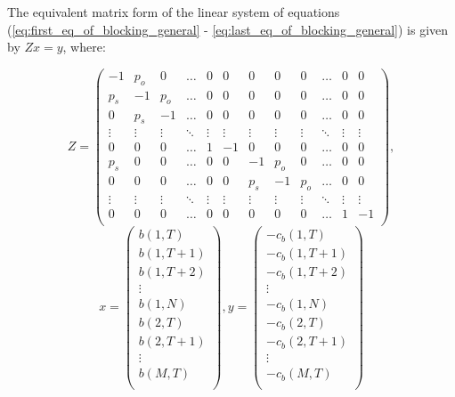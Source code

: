 The equivalent matrix form of the linear system of equations
(\ref{eq:first_eq_of_blocking_general} - \ref{eq:last_eq_of_blocking_general})
is given by \(Zx=y\), where:

\newcommand{\secondallthedots}{\vdots & \vdots & \vdots & \ddots & \vdots & \vdots &
\vdots & \vdots & \vdots & \ddots & \vdots & \vdots}

\begin{equation}
    Z =
    \begin{pmatrix}
        -1 & p_o & 0 & \dots & 0 & 0 & 0 & 0 & 0 & \dots & 0 & 0 \\ %
        p_s & -1 & p_o & \dots & 0 & 0 & 0 & 0 & 0 & \dots & 0 & 0 \\ %
        0 & p_s & -1 & \dots & 0 & 0 & 0 & 0 & 0 & \dots & 0 & 0 \\ %
        \secondallthedots \\
        0 & 0 & 0 & \dots & 1 & -1 & 0 & 0 & 0 & \dots & 0 & 0 \\ %
        p_s & 0 & 0 & \dots & 0 & 0 & -1 & p_o & 0 & \dots & 0 & 0 \\ %
        0 & 0 & 0 & \dots & 0 & 0 & p_s & -1 & p_o & \dots & 0 & 0 \\ %
        \secondallthedots \\
        0 & 0 & 0 & \dots & 0 & 0 & 0 & 0 & 0 & \dots & 1 & -1 \\ %
    \end{pmatrix},
\end{equation}
\begin{equation}\label{eq:general_direct_approach_blocking_time}
    x =
    \begin{pmatrix}
        b(1,T) \\
        b(1,T+1) \\
        b(1,T+2) \\
        \vdots \\
        b(1,N) \\
        b(2,T) \\
        b(2,T+1) \\
        \vdots \\
        b(M,T) \\
    \end{pmatrix},
    y=
    \begin{pmatrix}
        -c_b(1,T) \\
        -c_b(1,T+1) \\
        -c_b(1,T+2) \\
        \vdots \\
        -c_b(1,N) \\
        -c_b(2,T) \\
        -c_b(2,T+1) \\
        \vdots \\
        -c_b(M,T) \\
    \end{pmatrix}
\end{equation}

